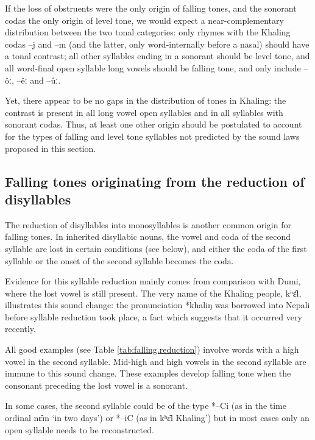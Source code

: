 \documentclass[oldfontcommands,oneside,a4paper,11pt]{article}
\newcommand{\ipa}[1]{{\phon \mbox{#1}}} %
\begin{document}
If the loss of obstruents were the only origin of falling tones, and the sonorant codas the only origin of level tone, we would expect a near-complementary distribution between the two tonal categories: only rhymes with the Khaling codas \ipa{--j} and \ipa{--m} (and the latter, only word-internally before a nasal) should have a tonal contrast; all other syllables ending in a sonorant should be level tone, and all word-final open syllable long vowels should be falling tone, and only include \ipa{--ôː}, \ipa{--êː} and \ipa{--ûː}.

Yet, there appear to be no gaps in the distribution of tones in Khaling: the contrast is present in all long vowel open syllables and in all syllables with sonorant codas. Thus, at least one other origin should be postulated to account for the types of falling and level tone syllables not predicted by the sound laws proposed in this section.

\subsection{Falling tones originating from the reduction of disyllables} \label{sec:disyll}
The reduction of disyllables into monosyllables is another common origin for falling tones. In inherited disyllabic nouns, the vowel and coda of the second syllable are   lost in certain conditions (see below), and either the coda of the first syllable or the onset of the second syllable becomes the coda.

Evidence for this syllable reduction mainly comes from comparison with Dumi, where the lost vowel is still present. The very name of the Khaling people, \ipa{kʰɛ‍̂l}, illustrates this sound change: the pronunciation \ipa{*khaliŋ}		was borrowed into Nepali before syllable reduction took place, a fact which suggests that it occurred very recently.

All good examples (see Table \ref{tab:falling.reduction}) involve words with a high vowel in the second syllable. Mid-high and high vowels in the second syllable are immune to this sound change. These examples develop falling tone when the consonant preceding the lost vowel is a sonorant.

In some cases, the second syllable could be of the type *--Ci (as in the time ordinal \ipa{nɛ̂m}  `in two days') or *--iC (as in \ipa{kʰɛ‍̂l}  Khaling') but in most cases only an open syllable  needs to be reconstructed.
\end{document}
